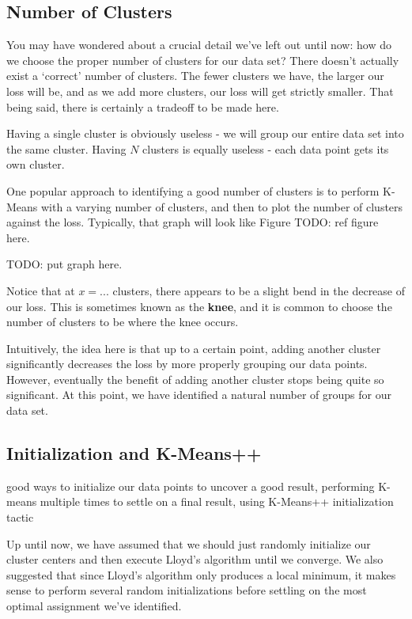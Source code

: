 \subsection{Number of Clusters}
You may have wondered about a crucial detail we've left out until now: how do we choose the proper number of clusters for our data set? There doesn't actually exist a `correct' number of clusters. The fewer clusters we have, the larger our loss will be, and as we add more clusters, our loss will get strictly smaller. That being said, there is certainly a tradeoff to be made here.

Having a single cluster is obviously useless - we will group our entire data set into the same cluster. Having $N$ clusters is equally useless - each data point gets its own cluster.

One popular approach to identifying a good number of clusters is to perform K-Means with a varying number of clusters, and then to plot the number of clusters against the loss. Typically, that graph will look like Figure TODO: ref figure here.

TODO: put graph here.

Notice that at $x=...$ clusters, there appears to be a slight bend in the decrease of our loss. This is sometimes known as the \textbf{knee}, and it is common to choose the number of clusters to be where the knee occurs.

Intuitively, the idea here is that up to a certain point, adding another cluster significantly decreases the loss by more properly grouping our data points. However, eventually the benefit of adding another cluster stops being quite so significant. At this point, we have identified a natural number of groups for our data set.

\subsection{Initialization and K-Means++}
good ways to initialize our data points to uncover a good result, performing K-means multiple times to settle on a final result, using K-Means++ initialization tactic

Up until now, we have assumed that we should just randomly initialize our cluster centers and then execute Lloyd's algorithm until we converge. We also suggested that since Lloyd's algorithm only produces a local minimum, it makes sense to perform several random initializations before settling on the most optimal assignment we've identified.

